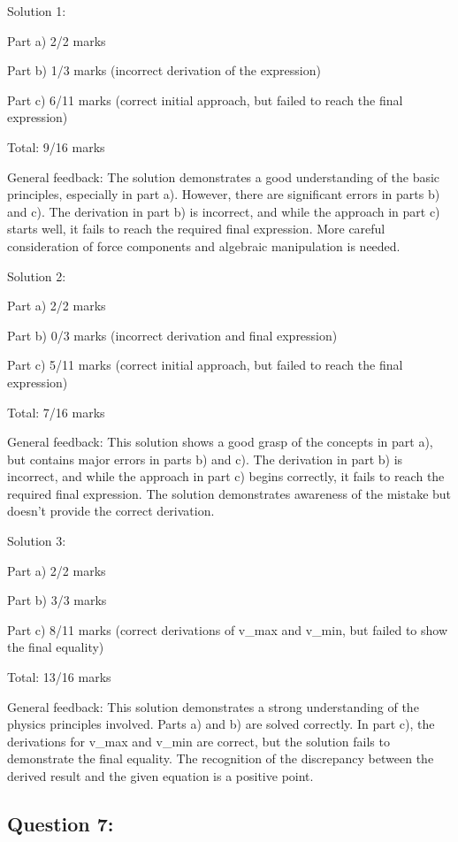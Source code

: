 \documentclass[a4paper,11pt]{article}
\begin{document}
Solution 1:

Part a) 2/2 marks

Part b) 1/3 marks (incorrect derivation of the expression)

Part c) 6/11 marks (correct initial approach, but failed to reach the final expression)

Total: 9/16 marks

General feedback: The solution demonstrates a good understanding of the basic principles, especially in part a). However, there are significant errors in parts b) and c). The derivation in part b) is incorrect, and while the approach in part c) starts well, it fails to reach the required final expression. More careful consideration of force components and algebraic manipulation is needed.

Solution 2:

Part a) 2/2 marks

Part b) 0/3 marks (incorrect derivation and final expression)

Part c) 5/11 marks (correct initial approach, but failed to reach the final expression)

Total: 7/16 marks

General feedback: This solution shows a good grasp of the concepts in part a), but contains major errors in parts b) and c). The derivation in part b) is incorrect, and while the approach in part c) begins correctly, it fails to reach the required final expression. The solution demonstrates awareness of the mistake but doesn't provide the correct derivation.

Solution 3:

Part a) 2/2 marks

Part b) 3/3 marks

Part c) 8/11 marks (correct derivations of v_max and v_min, but failed to show the final equality)

Total: 13/16 marks

General feedback: This solution demonstrates a strong understanding of the physics principles involved. Parts a) and b) are solved correctly. In part c), the derivations for v_max and v_min are correct, but the solution fails to demonstrate the final equality. The recognition of the discrepancy between the derived result and the given equation is a positive point.

\subsection*{Question 7:}
\end{document}
